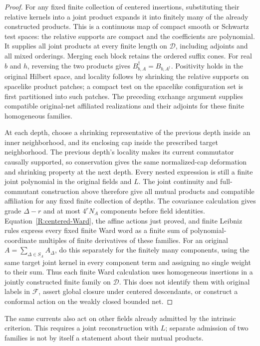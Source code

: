 \begin{proof}
For any fixed finite collection of centered insertions, substituting
their relative kernels into a joint product expands it into finitely
many of the already constructed products.  This is a continuous map
of compact smooth or Schwartz test spaces: the relative supports are
compact and the coefficients are polynomial.  It supplies all joint
products at every finite length on $\mathcal D$, including adjoints
and all mixed orderings.  Merging each block retains the ordered suffix
cones.  For real $b$ and $h$, reversing the two products gives
$B_{b,A}^\dagger=B_{b,A^\dagger}$.  Positivity holds in the original
Hilbert space, and locality
follows by shrinking the relative supports on spacelike product patches;
a compact test on the spacelike configuration set is first partitioned
into such patches.  The preceding exchange argument supplies compatible
original-net affiliated realizations and their adjoints for these finite
homogeneous families.

At each depth, choose a shrinking representative of the previous depth
inside an inner neighborhood, and its enclosing cap inside the prescribed
target neighborhood.  The previous depth's locality makes its current
commutator causally supported, so conservation gives the same normalized-cap
deformation and shrinking property at the next depth.  Every nested
expression is still a finite joint polynomial in the original fields
and $L$.  The joint continuity and full-commutant construction above
therefore give all mutual products and compatible affiliation for any
fixed finite collection of depths.  The covariance calculation gives
grade $\Delta-r$ and at most $4^rN_A$ components before field identities.
Equation~\eqref{R:centered-Ward}, the affine actions just
proved, and finite Leibniz rules express every fixed finite Ward word
as a finite sum of polynomial-coordinate multiples of finite derivatives
of these families.  For an original
$A=\sum_{\Delta\in S_A}A_\Delta$, do this separately for the finitely
many components, using the same target joint kernel in every component
term and assigning no single weight to their sum.  Thus each finite Ward
calculation uses homogeneous insertions in a jointly constructed finite
family on $\mathcal D$.  This does not identify them with original labels
in $\mathcal F$, assert global closure under centered descendants, or
construct a conformal action on the weakly closed bounded net.
\end{proof}

The same currents also act on other fields already admitted by the
intrinsic criterion.  This requires a joint reconstruction with $L$;
separate admission of two families is not by itself a statement about
their mutual products.

